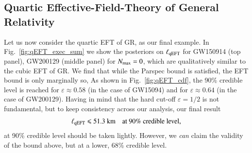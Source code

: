 \documentclass[twocolumn,
               prd,
               aps,
               superscriptaddress,
               tightenlines,
               nofootinbib,
               eqsecnum,
               amsfonts,
               amsmath,
               longbibliography]{revtex4-1}
\begin{document}
\subsection{Quartic Effective-Field-Theory of General Relativity}
\label{sec:results_qeft}

Let us now consider the quartic EFT of GR, as our final example.
%
In Fig.~\ref{fig:qEFT_exec_sum} we show the posteriors on $\ell_{\rm qEFT}$ for GW150914 (top panel),
GW200129 (middle panel) for $N_{\rm max} = 0$, which are qualitatively similar to the cubic EFT of GR.
%
We find that while the Parspec bound is satisfied, the EFT bound is only marginally so,
%
As shown in Fig.~\ref{fig:qEFT_cdf}, the 90\% credible level is reached for $\varepsilon \approx 0.58$
(in the case of GW15094) and for $\varepsilon \approx 0.64$ (in the case of GW200129).
%
Having in mind that the hard cut-off $\varepsilon = 1/2$ is not fundamental, but to keep consistency
across our analysis, our final result
%
\begin{equation}
    \ell_{\rm qEFT} \leqslant 51.3~\textrm{km} \quad \textrm{at 90\% credible level},
\end{equation}
%
at 90\% credible level should be taken lightly.
%
However, we \emph{can} claim the validity of the bound above, but at a lower,
68\% credible level.
\end{document}
